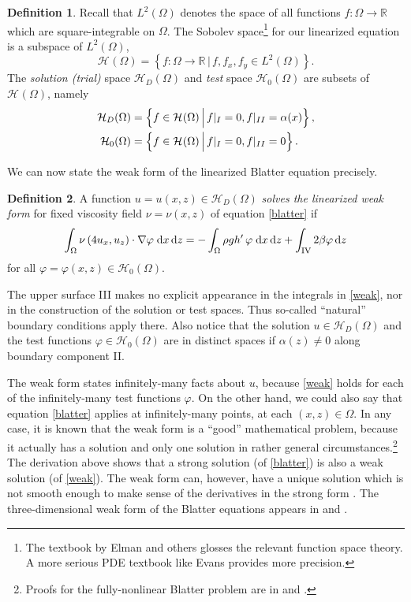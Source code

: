 \documentclass[11pt,final,reqno]{amsart}
\theoremstyle{remark}
\theoremstyle{definition}
\newtheorem*{defn}{Definition}
\newcommand{\RR}{\mathbb{R}}
\newcommand{\HoneX}[1]{\mathcal{H}_{#1}(\Omega)}
\newcommand{\Hone}{\HoneX{}}
\newcommand{\HoneD}{\HoneX{D}}
\newcommand{\Honezero}{\HoneX{0}}
\begin{document}
\begin{defn}  Recall that $L^2(\Omega)$ denotes the space of all functions $f : \Omega \to \RR$ which are square-integrable on $\Omega$.  The Sobolev space\footnote{The textbook by Elman and others \cite{Elmanetal2005} glosses the relevant function space theory.  A more serious PDE textbook like Evans \cite{Evans} provides more precision.} for our linearized equation is a subspace of  $L^2(\Omega)$,
	$$\Hone = \left\{f:\Omega \to \RR \,\Big|\, f,f_x,f_y \in L^2(\Omega)\right\}.$$
The \emph{solution (trial)} space $\HoneD$ and \emph{test} space $\Honezero$ are subsets of $\Hone$, namely
\begin{align}
     \HoneD &= \left\{f \in \Hone \,\Big|\, f|_{I} = 0, f|_{II} = \alpha(x)\right\}, \label{solntestspaces} \\
  \Honezero &= \left\{f \in \Hone \,\Big|\, f|_{I} = 0, f|_{II} = 0\right\}. \notag
\end{align}
\end{defn}

We can now state the weak form of the linearized Blatter equation precisely.

\begin{defn}
A function $u=u(x,z)\in\HoneD$ \emph{solves the linearized weak form} for fixed viscosity field $\nu=\nu(x,z)$ of equation \eqref{blatter} if
\begin{equation}
\int_\Omega \nu\, (4 u_x, u_z) \cdot \nabla \varphi \;\mathrm{d}x\,\mathrm{d}z = - \int_\Omega \rho g h'\,\varphi \;\mathrm{d}x\,\mathrm{d}z + \int_{\mathrm{IV}} 2 \beta \varphi \,\mathrm{d}z \label{weak}
\end{equation}
for all $\varphi=\varphi(x,z)\in\Honezero$.
\end{defn}

The upper surface III makes no explicit appearance in the integrals in \eqref{weak}, nor in the construction of the solution or test spaces.  Thus so-called ``natural'' boundary conditions apply there.  Also notice that the solution $u\in \HoneD$ and the test functions $\varphi \in \Honezero$ are in distinct spaces if $\alpha(z)\ne 0$ along boundary component II.

The weak form states infinitely-many facts about $u$, because \eqref{weak} holds for each of the infinitely-many test functions $\varphi$.  On the other hand, we could also say that equation \eqref{blatter} applies at infinitely-many points, at each $(x,z)\in \Omega$.  In any case, it is known that the weak form is a ``good'' mathematical problem, because it actually has a solution and only one solution in rather general circumstances.\footnote{Proofs for the fully-nonlinear Blatter problem are in \cite[theorem 2.1]{RappazReist05} and \cite[theorem 4.2]{SchoofCoulombBlatter}.}  The derivation above shows that a strong solution (of \eqref{blatter}) is also a weak solution (of \eqref{weak}).  The weak form can, however, have a unique solution which is not smooth enough to make sense of the derivatives in the strong form \cite{Evans}.  The three-dimensional weak form of the Blatter equations appears in \cite{BrownSmithAhmadia2013} and \cite{SchoofCoulombBlatter}.
\end{document}
